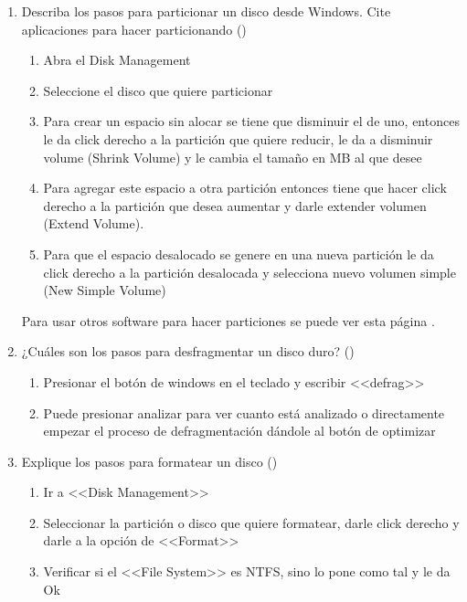 \documentclass[stu, 12pt, letterpaper, donotrepeattitle, floatsintext, natbib, helv]{apa7}
\begin{document}
\begin{enumerate}
    \item Describa los pasos para particionar un disco desde Windows. Cite aplicaciones para hacer particionando (\cite{PartitionCreator})
    
    \begin{enumerate}
        \item Abra el Disk Management
        \item Seleccione el disco que quiere particionar
        \item Para crear un espacio sin alocar se tiene que disminuir el de uno, entonces le da click derecho a la partición que quiere reducir, le da a disminuir volume (Shrink Volume) y le cambia el tamaño en MB al que desee
        \item Para agregar este espacio a otra partición entonces tiene que hacer click derecho a la partición que desea aumentar y darle extender volumen (Extend Volume).
        \item Para que el espacio desalocado se genere en una nueva partición le da click derecho a la partición desalocada y selecciona nuevo volumen simple (New Simple Volume)
    \end{enumerate}

    Para usar otros software para hacer particiones se puede ver esta página \cite{PartiSoft}.

    \item ¿Cuáles son los pasos para desfragmentar un disco duro? (\cite{Defragmentation})
    \begin{enumerate}
        \item Presionar el botón de windows en el teclado y escribir <<defrag>> 
        \item Puede presionar analizar para ver cuanto está analizado o directamente empezar el proceso de defragmentación dándole al botón de optimizar
    \end{enumerate}

    \item Explique los pasos para formatear un disco (\cite{Format})
    
    \begin{enumerate}
        \item Ir a <<Disk Management>>
        \item Seleccionar la partición o disco que quiere formatear, darle click derecho y darle a la opción de <<Format>>
        \item Verificar si el <<File System>> es NTFS, sino lo pone como tal y le da Ok 
    \end{enumerate}
    

\end{enumerate}
\end{document}
